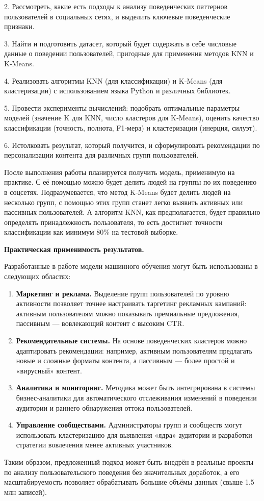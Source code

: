 \documentclass[14pt, a4paper]{extarticle}
\begin{document}
2. Рассмотреть, какие есть подходы к анализу поведенческих паттернов пользователей в социальных сетях, и выделить ключевые поведенческие
признаки.

3. Найти и подготовить датасет, который будет содержать в себе числовые данные о поведении пользователей, пригодные для применения
методов KNN и K‑Means.

4. Реализовать алгоритмы KNN (для классификации) и K‑Means (для кластеризации) с использованием языка Python и различных библиотек.

5. Провести эксперименты вычислений: подобрать оптимальные параметры моделей (значение K для KNN, число кластеров для K‑Means),
оценить качество классификации (точность, полнота, F1‑мера) и кластеризации (инерция, силуэт).

6. Истолковать результат, который получится, и сформулировать рекомендации по персонализации контента для различных групп пользователей.

После выполнения работы планируется получить модель, применимую на практике. С её помощью можно будет делить людей на группы по их 
поведению в соцсетях. Подразумевается, что метод K‑Means будет делить людей на несколько групп, с помощью этих групп станет легко 
выявить активных или пассивных пользователей. А алгоритм KNN, как предполагается, будет правильно определять принадлежность пользователя,
то есть достигнет точности классификации как минимум 80\% на тестовой выборке.

\textbf{Практическая применимость результатов.} 

Разработанные в работе модели машинного обучения могут быть использованы в следующих областях:

\begin{enumerate}
    \item \textbf{Маркетинг и реклама.} Выделение групп пользователей по уровню активности позволяет точнее настраивать таргетинг рекламных кампаний: активным пользователям можно показывать премиальные предложения, пассивным — вовлекающий контент с высоким CTR.
    
    \item \textbf{Рекомендательные системы.} На основе поведенческих кластеров можно адаптировать рекомендации: например, активным пользователям предлагать новые и сложные форматы контента, а пассивным — более простой и «вирусный» контент.
    
    \item \textbf{Аналитика и мониторинг.} Методика может быть интегрирована в системы бизнес-аналитики для автоматического отслеживания изменений в поведении аудитории и раннего обнаружения оттока пользователей.
    
    \item \textbf{Управление сообществами.} Администраторы групп и сообществ могут использовать кластеризацию для выявления «ядра» аудитории и разработки стратегии вовлечения менее активных участников.
\end{enumerate}
\newpage
Таким образом, предложенный подход может быть внедрён в реальные проекты по анализу пользовательского поведения без значительных доработок, а его масштабируемость позволяет обрабатывать большие объёмы данных (свыше 1.5 млн записей).
\end{document}
